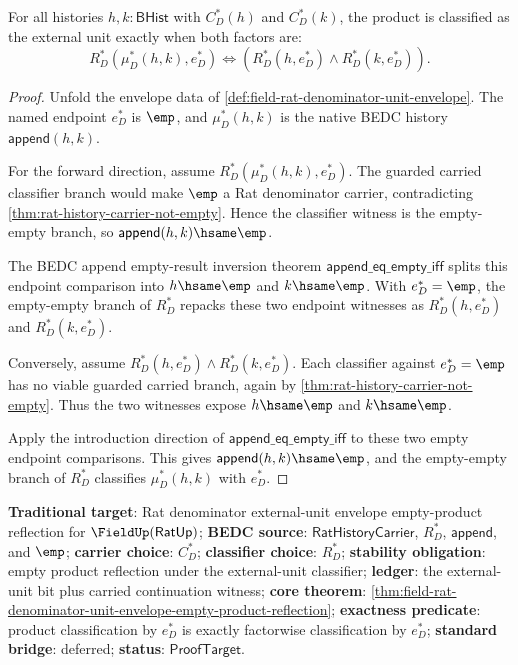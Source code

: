 \begin{theorem}
\label{thm:field-rat-denominator-unit-envelope-empty-product-reflection}
For all histories $h,k:\mathsf{BHist}$ with $C_D^\ast(h)$ and $C_D^\ast(k)$,
the product is classified as the external unit exactly when both factors are:
$$
R_D^\ast(\mu_D^\ast(h,k),e_D^\ast)
\Longleftrightarrow
\left(R_D^\ast(h,e_D^\ast)\land R_D^\ast(k,e_D^\ast)\right).
$$
\end{theorem}
\begin{proof}
Unfold the envelope data of
\autoref{def:field-rat-denominator-unit-envelope}. The named endpoint
$e_D^\ast$ is $\emp$, and $\mu_D^\ast(h,k)$ is the native BEDC history
$\mathsf{append}(h,k)$.

For the forward direction, assume
$R_D^\ast(\mu_D^\ast(h,k),e_D^\ast)$. The guarded carried classifier branch
would make $\emp$ a Rat denominator carrier, contradicting
\autoref{thm:rat-history-carrier-not-empty}. Hence the classifier witness is
the empty-empty branch, so $\mathsf{append}(h,k)\hsame\emp$.

The BEDC append empty-result inversion theorem
$\mathsf{append\_eq\_empty\_iff}$ splits this endpoint comparison into
$h\hsame\emp$ and $k\hsame\emp$. With $e_D^\ast=\emp$, the empty-empty branch of
$R_D^\ast$ repacks these two endpoint witnesses as
$R_D^\ast(h,e_D^\ast)$ and $R_D^\ast(k,e_D^\ast)$.

Conversely, assume
$R_D^\ast(h,e_D^\ast)\land R_D^\ast(k,e_D^\ast)$. Each classifier against
$e_D^\ast=\emp$ has no viable guarded carried branch, again by
\autoref{thm:rat-history-carrier-not-empty}. Thus the two witnesses expose
$h\hsame\emp$ and $k\hsame\emp$.

Apply the introduction direction of $\mathsf{append\_eq\_empty\_iff}$ to these
two empty endpoint comparisons. This gives
$\mathsf{append}(h,k)\hsame\emp$, and the empty-empty branch of $R_D^\ast$
classifies $\mu_D^\ast(h,k)$ with $e_D^\ast$.
\end{proof}

\textbf{Traditional target}: Rat denominator external-unit envelope
empty-product reflection for $\FieldUp(\mathsf{RatUp})$; \textbf{BEDC source}:
$\mathsf{RatHistoryCarrier}$, $R_D^\ast$, $\mathsf{append}$, and $\emp$;
\textbf{carrier choice}: $C_D^\ast$; \textbf{classifier choice}: $R_D^\ast$;
\textbf{stability obligation}: empty product reflection under the
external-unit classifier; \textbf{ledger}: the external-unit bit plus carried
continuation witness; \textbf{core theorem}:
\autoref{thm:field-rat-denominator-unit-envelope-empty-product-reflection};
\textbf{exactness predicate}: product classification by $e_D^\ast$ is exactly
factorwise classification by $e_D^\ast$; \textbf{standard bridge}: deferred;
\textbf{status}: $\mathsf{ProofTarget}$.
